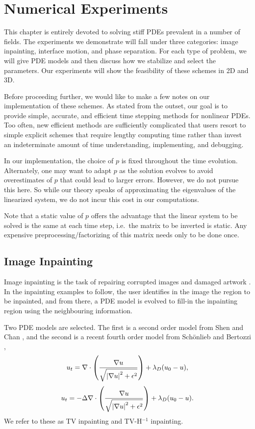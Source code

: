\chapter{Numerical Experiments}
\label{chap:num experiments}
This chapter is entirely devoted to solving stiff PDEs prevalent in a number of fields. The experiments we demonstrate will fall under three categories: image inpainting, interface motion, and phase separation. For each type of problem, we will give PDE models and then discuss how we stabilize and select the parameters. Our experiments will show the feasibility of these schemes in 2D and 3D. 

Before proceeding further, we would like to make a few notes on our implementation of these schemes. As stated from the outset, our goal is to provide simple, accurate, and efficient time stepping methods for nonlinear PDEs. Too often, new efficient methods are sufficiently complicated that users resort to simple explicit schemes that require lengthy computing time rather than invest an indeterminate amount of time understanding, implementing, and debugging.

In our implementation, the choice of $p$ is fixed throughout the time evolution. Alternately, one may want to adapt $p$ as the solution evolves to avoid overestimates of $p$ that could lead to larger errors. However, we do not pursue this here. So while our theory speaks of approximating the eigenvalues of the linearized system, we do not incur this cost in our computations. 

Note that a static value of $p$ offers the advantage that the linear system to be solved is the same at each time step, i.e.\ the matrix to be inverted is static. Any expensive preprocessing/factorizing of this matrix needs only to be done once.

\section{Image Inpainting}
Image inpainting is the task of repairing corrupted images and damaged artwork \cite{bertalmio2000image}. In the inpainting examples to follow, the user identifies in the image the region to be inpainted, and from there, a PDE model is evolved to fill-in the inpainting region using the neighbouring information.

Two PDE models are selected. The first is a second order model from Shen and Chan \cite{shen2002mathematical}, and the second is a recent fourth order model from Sch{\"o}nlieb and Bertozzi \cite{schonlieb2011unconditionally},
\begin{align}
        u_t  = \nabla \cdot \left(\frac{\nabla u}{\sqrt{\left|\nabla u\right|^2 + \epsilon^2}} \right) 
+ \lambda_D(u_0 - u), 
\label{bv inpaint}
\end{align}
\begin{align}
         u_t  = -\Delta \nabla \cdot \left(\frac{\nabla u}{\sqrt{\left|\nabla u\right|^2 + \epsilon^2}} \right) 
+ \lambda_D(u_0 - u).
\label{tvhneg inpaint}
\end{align}
We refer to these as TV inpainting and TV-H$^{-1}$ inpainting.

